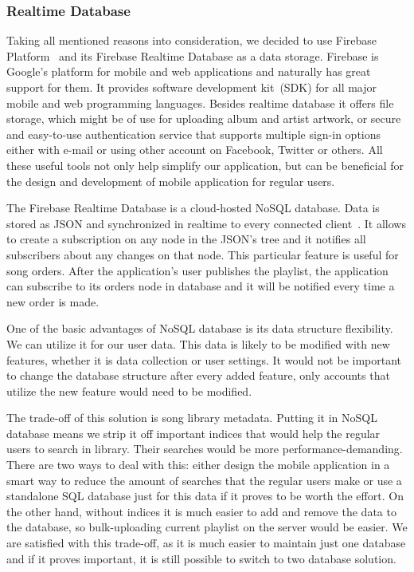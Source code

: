 \subsubsection{Realtime Database}

Taking all mentioned reasons into consideration, we decided to use Firebase Platform~\citep{firebase} and its Firebase Realtime Database as a data storage. Firebase is Google's platform for mobile and web applications and naturally has great support for them. It provides software development kit~(SDK) for all major mobile and web programming languages. Besides realtime database it offers file storage, which might be of use for uploading album and artist artwork, or secure and easy-to-use authentication service that supports multiple sign-in options either with e-mail or using other account on Facebook, Twitter or others. All these useful tools not only help simplify our application, but can be beneficial for the design and development of mobile application for regular users.
\par
The Firebase Realtime Database is a cloud-hosted NoSQL database. Data is stored as JSON and synchronized in realtime to every connected client~\citep{firebaseDocs}. It allows to create a subscription on any node in the JSON's tree and it notifies all subscribers about any changes on that node. This particular feature is useful for song orders. After the application's user publishes the playlist, the application can subscribe to its orders node in database and it will be notified every time a new order is made.
\par
One of the basic advantages of NoSQL database is its data structure flexibility. We can utilize it for our user data. This data is likely to be modified with new features, whether it is data collection or user settings. It would not be important to change the database structure after every added feature, only accounts that utilize the new feature would need to be modified.
\par
The trade-off of this solution is song library metadata. Putting it in NoSQL database means we strip it off important indices that would help the regular users to search in library. Their searches would be more performance-demanding. There are two ways to deal with this: either design the mobile application in a smart way to reduce the amount of searches that the regular users make or use a standalone SQL database just for this data if it proves to be worth the effort. On the other hand, without indices it is much easier to add and remove the data to the database, so bulk-uploading current playlist on the server would be easier. We are satisfied with this trade-off, as it is much easier to maintain just one database and if it proves important, it is still possible to switch to two database solution.
